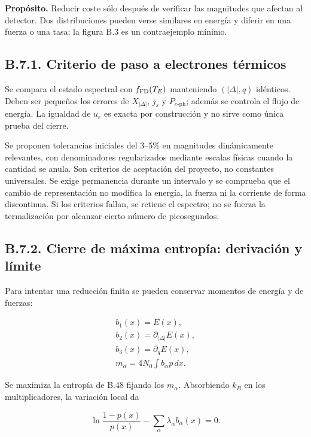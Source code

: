 \documentclass[
  spanish,
  10pt,
  a4paper,
]{article}
\begin{document}
\textbf{Propósito.} Reducir coste sólo después de verificar las
magnitudes que afectan al detector. Dos distribuciones pueden verse
similares en energía y diferir en una fuerza o una tasa; la figura B.3
es un contraejemplo mínimo.

\subsection{B.7.1. Criterio de paso a electrones
térmicos}\label{b.7.1.-criterio-de-paso-a-electrones-tuxe9rmicos}

Se compara el estado espectral con \(f_{\rm FD}(T_E)\) manteniendo
\((|\Delta|,q)\) idénticos. Deben ser pequeños los errores de
\(X_{|\Delta|}\), \(j_s\) y \(P_{e\text{-ph}}\); además se controla el
flujo de energía. La igualdad de \(u_e\) es exacta por construcción y no
sirve como única prueba del cierre.

Se proponen tolerancias iniciales del 3--5\% en magnitudes dinámicamente
relevantes, con denominadores regularizados mediante escalas físicas
cuando la cantidad se anula. Son criterios de aceptación del proyecto,
no constantes universales. Se exige permanencia durante un intervalo y
se comprueba que el cambio de representación no modifica la energía, la
fuerza ni la corriente de forma discontinua. Si los criterios fallan, se
retiene el espectro; no se fuerza la termalización por alcanzar cierto
número de picosegundos.

\subsection{B.7.2. Cierre de máxima entropía: derivación y
límite}\label{b.7.2.-cierre-de-muxe1xima-entropuxeda-derivaciuxf3n-y-luxedmite}

Para intentar una reducción finita se pueden conservar momentos de
energía y de fuerzas:

\[
\begin{gathered}
b_1(x)=E(x),\\
b_2(x)=\partial_{|\Delta|}E(x),\\
b_3(x)=\partial_qE(x),\\
m_\alpha=4N_0\int b_\alpha p\,dx.
\end{gathered} \tag{B.33}
\]

Se maximiza la entropía de B.48 fijando los \(m_\alpha\). Absorbiendo
\(k_B\) en los multiplicadores, la variación local da

\[
\ln\frac{1-p(x)}{p(x)}-\sum_\alpha\lambda_\alpha b_\alpha(x)=0.
\]
\end{document}
